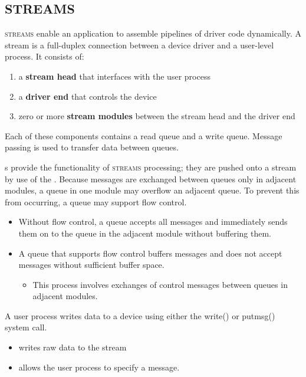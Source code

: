 \subsection{STREAMS}\label{subsec:STREAMS}
\textsc{streams} enable an application to assemble pipelines of driver code dynamically.
A stream is a full-duplex connection between a device driver and a user-level process.
It consists of:
\begin{enumerate}[noitemsep]
\item a \textbf{stream head} that interfaces with the user process
\item a \textbf{driver end} that controls the device
\item zero or more \textbf{stream modules} between the stream head and the driver end
\end{enumerate}

Each of these components contains a read queue and a write queue.
Message passing is used to transfer data between queues.

s provide the functionality of \textsc{streams} processing; they are pushed onto a stream by use of the  .
Because messages are exchanged between queues only in adjacent modules, a queue in one module may overflow an adjacent queue.
To prevent this from occurring, a queue may support flow control.
\begin{itemize}[noitemsep]
\item Without flow control, a queue accepts all messages and immediately sends them on to the queue in the adjacent module without buffering them.
\item A queue that supports flow control buffers messages and does not accept messages without sufficient buffer space.
  \begin{itemize}[noitemsep]
  \item This process involves exchanges of control messages between queues in adjacent modules.
  \end{itemize}
\end{itemize}

A user process writes data to a device using either the write() or putmsg() system call.
\begin{itemize}[noitemsep]
\item {} writes raw data to the stream
\item {} allows the user process to specify a message.
\end{itemize}

